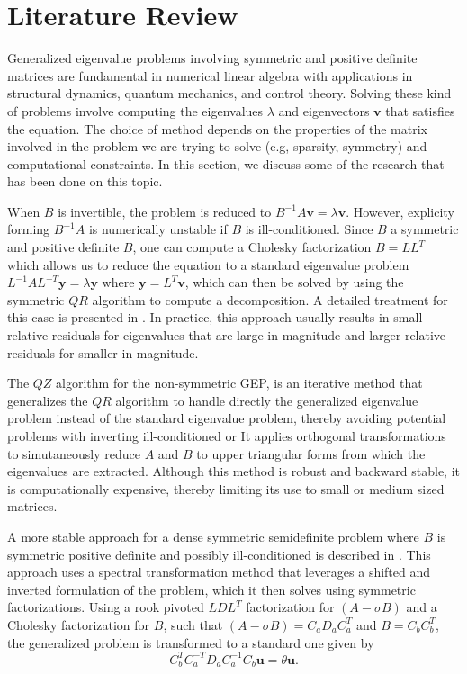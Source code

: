 \section{Literature Review}\label{sec:LiteratureReview}
Generalized eigenvalue problems involving symmetric and positive definite matrices are fundamental in numerical linear algebra with applications in structural  dynamics, quantum mechanics, and control theory. Solving these kind of problems involve computing the eigenvalues $\lambda$ and eigenvectors $\mathbf{v}$ that satisfies the equation. The choice of method depends on the properties of the matrix involved in the problem we are trying to solve (e.g, sparsity, symmetry) and computational constraints. In this section, we discuss some of the research that has been done on this topic.

When $B$ is invertible, the problem is reduced to $B^{-1}A\mathbf{v} = \lambda \mathbf{v}$. However, explicity forming $B^{-1}A$ is numerically unstable if $B$ is ill-conditioned. Since $B$ a symmetric and positive definite $B$, one can compute a Cholesky factorization $B = LL^{T}$ which allows us to reduce the equation to a standard eigenvalue problem $L^{-1}AL^{-T}\mathbf{y} = \lambda \mathbf{y}$ where $\mathbf{y}= L^T \mathbf{v}$, which can then be solved by using the symmetric $QR$ algorithm to compute a  decomposition. A detailed treatment for this case is presented in \cite{doi:10.1137/1.9781421407944}. In practice, this approach usually results in small relative residuals for eigenvalues that are large in magnitude and larger relative residuals for  smaller in magnitude.

The $QZ$ algorithm \cite{5b3d5fb1-4813-3046-9331-a730b392f611} for the non-symmetric GEP, is an iterative method that generalizes the $QR$ algorithm to handle directly the generalized eigenvalue problem instead of the standard eigenvalue problem, thereby avoiding potential problems with inverting ill-conditioned or  It applies orthogonal transformations to simutaneously reduce $A$ and $B$ to upper triangular forms from which the eigenvalues are extracted. Although this method is robust and backward stable, it is computationally expensive, thereby limiting its use to small or medium sized matrices.

A more stable approach for a dense symmetric semidefinite problem where $B$ is symmetric positive definite and possibly ill-conditioned is described in \cite{stewart2024spectraltransformationdensesymmetric}. This approach uses a spectral transformation method that leverages a shifted and inverted formulation of the problem, which it then solves using symmetric factorizations. Using a rook pivoted $LDL^T$ factorization for $(A-\sigma B)$ and a Cholesky factorization for $B$, such that $(A-\sigma B) = C_aD_aC_a^T$ and $B = C_bC_b^T$, the generalized problem is transformed to a standard one given by
\begin{equation}\label{eq:SpectralTrans_With_LDL}
	C_b^TC_a^{-T}D_aC_a^{-1}C_b \mathbf{u} = \theta \mathbf{u}.
\end{equation}

